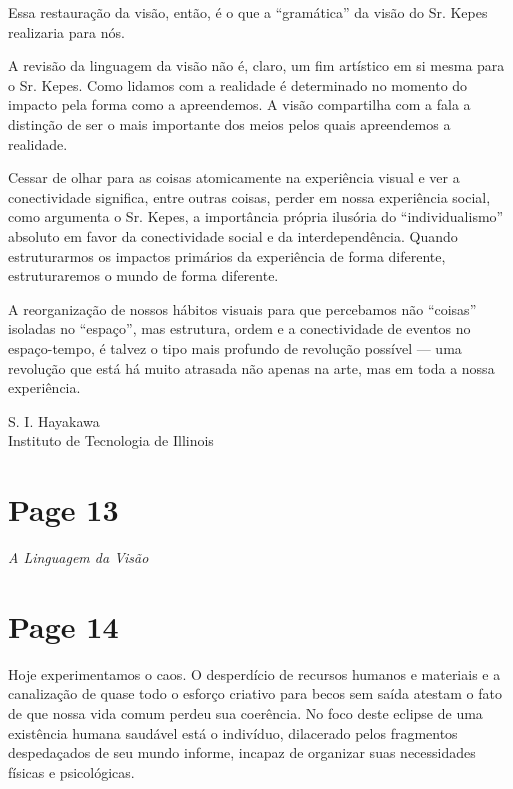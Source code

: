 \documentclass[a4paper]{article}
\begin{document}
Essa restauração da visão, então, é o que a ``gramática'' da visão do Sr. Kepes realizaria para nós.

A revisão da linguagem da visão não é, claro, um fim artístico em si mesma para o Sr. Kepes. Como lidamos com a realidade é determinado no momento do impacto pela forma como a apreendemos. A visão compartilha com a fala a distinção de ser o mais importante dos meios pelos quais apreendemos a realidade.

Cessar de olhar para as coisas atomicamente na experiência visual e ver a conectividade significa, entre outras coisas, perder em nossa experiência social, como argumenta o Sr. Kepes, a importância própria ilusória do ``individualismo'' absoluto em favor da conectividade social e da interdependência. Quando estruturarmos os impactos primários da experiência de forma diferente, estruturaremos o mundo de forma diferente.

A reorganização de nossos hábitos visuais para que percebamos não ``coisas'' isoladas no ``espaço'', mas estrutura, ordem e a conectividade de eventos no espaço-tempo, é talvez o tipo mais profundo de revolução possível --- uma revolução que está há muito atrasada não apenas na arte, mas em toda a nossa experiência.

\raggedleft
S. I. Hayakawa \\
Instituto de Tecnologia de Illinois

\newpage
\section*{Page 13}

\centering
{\itshape A Linguagem da Visão}


\newpage
\section*{Page 14}

Hoje experimentamos o caos. O desperdício de recursos humanos e materiais e a canalização de quase todo o esforço criativo para becos sem saída atestam o fato de que nossa vida comum perdeu sua coerência. No foco deste eclipse de uma existência humana saudável está o indivíduo, dilacerado pelos fragmentos despedaçados de seu mundo informe, incapaz de organizar suas necessidades físicas e psicológicas.
\end{document}
